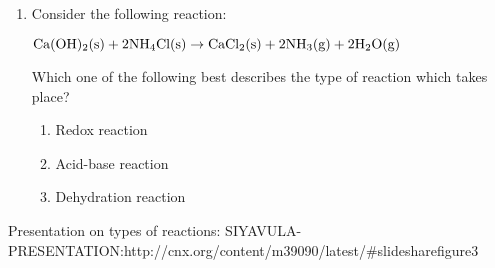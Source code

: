 {\begin{enumerate}
Is this reaction a substitution, addition or dehydration reaction? Give a reason for your answer.

\item{
Consider the following reaction:
\begin{center}
$\rm{Ca(OH)_{2}(s) + 2NH_{4}Cl (s) \rightarrow CaCl_{2}(s) + 2NH_{3}(g) + 2H_{2}O(g)}$
\end{center}

Which one of the following best describes the type of reaction which takes place?
		\begin{enumerate}
		\item{Redox reaction}
		\item{Acid-base reaction}
		\item{Dehydration reaction}
		\end{enumerate}
}
\end{enumerate}
\practiceinfo
}
Presentation on types of reactions: SIYAVULA-PRESENTATION:http://cnx.org/content/m39090/latest/#slidesharefigure3

